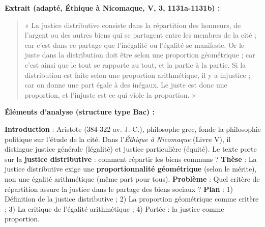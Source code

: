 \documentclass[11pt]{article}
\begin{document}
\begin{exoresolu}
\textbf{Extrait (adapté, Éthique à Nicomaque, V, 3, 1131a-1131b) :}
\begin{quote}
« La justice distributive consiste dans la répartition des honneurs, de l'argent ou des autres biens qui se partagent entre les membres de la cité ; car c'est dans ce partage que l'inégalité ou l'égalité se manifeste. Or le juste dans la distribution doit être selon une proportion géométrique ; car c'est ainsi que le tout se rapporte au tout, et la partie à la partie. Si la distribution est faite selon une proportion arithmétique, il y a injustice ; car on donne une part égale à des inégaux. Le juste est donc une proportion, et l'injuste est ce qui viole la proportion. »
\end{quote}

\textbf{Éléments d'analyse (structure type Bac) :}

\textbf{Introduction} : Aristote (384-322 av. J.-C.), philosophe grec, fonde la philosophie politique sur l'étude de la cité. Dans l'\emph{Éthique à Nicomaque} (Livre V), il distingue justice générale (légalité) et justice particulière (équité). Le texte porte sur la \textbf{justice distributive} : comment répartir les biens communs ? \textbf{Thèse} : La justice distributive exige une \textbf{proportionnalité géométrique} (selon le mérite), non une égalité arithmétique (même part pour tous). \textbf{Problème} : Quel critère de répartition assure la justice dans le partage des biens sociaux ? \textbf{Plan} : 1) Définition de la justice distributive ; 2) La proportion géométrique comme critère ; 3) La critique de l'égalité arithmétique ; 4) Portée : la justice comme proportion.


\end{exoresolu}
\end{document}
